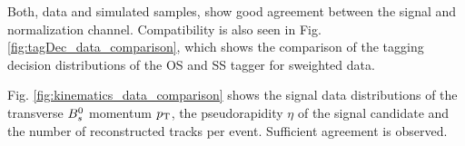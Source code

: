 Both, data and simulated samples, show good agreement between the signal and normalization channel. 
Compatibility is also seen in Fig. \ref{fig:tagDec_data_comparison}, which shows the comparison of the tagging decision distributions of the OS and SS tagger for sweighted data. 




Fig. \ref{fig:kinematics_data_comparison} shows the signal data distributions of the transverse ${{B}^0_{s}}$ momentum $\mbox{$p_{\mathrm{ T}}$}$, the pseudorapidity $\eta$ of the signal candidate and the number of reconstructed tracks per event.
Sufficient agreement is observed.


